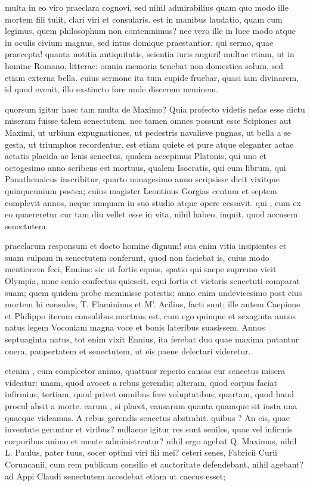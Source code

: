  multa in eo viro praeclara cognovi, sed nihil admirabilius quam quo modo ille mortem fili tulit, clari viri et consularis. est in manibus laudatio, quam cum legimus, quem philosophum non contemnimus? nec vero ille in luce modo atque in oculis civium magnus, sed intus domique praestantior. qui sermo, quae praecepta! quanta notitia antiquitatis, scientia iuris auguri! multae etiam, ut in homine Romano, litterae: omnia memoria tenebat non domestica solum, sed etiam externa bella. cuius sermone ita tum cupide fruebar, quasi iam divinarem, id quod evenit, illo exstincto fore unde discerem neminem.

 quorsum igitur haec tam multa de Maximo? Quia profecto videtis nefas esse dictu miseram fuisse talem senectutem. nec tamen omnes possunt esse Scipiones aut Maximi, ut urbium expugnationes, ut pedestris navalisve pugnas, ut bella a se gesta, ut triumphos recordentur. est etiam quiete et pure atque eleganter actae aetatis placida ac lenis senectus, qualem accepimus Platonis, qui uno et octogesimo anno scribens est mortuus, qualem Isocratis, qui eum librum, qui Panathenaicus inscribitur, quarto nonagesimo anno scripsisse dicit vixitque quinquennium postea; cuius magister Leontinus Gorgias centum et septem complevit annos, neque umquam in suo studio atque opere cessavit. qui , cum ex eo quaereretur cur tam diu vellet esse in vita, nihil habeo, inquit, quod accusem senectutem.

 praeclarum responsum et docto homine dignum! sua enim vitia insipientes et suam culpam in senectutem conferunt, quod non faciebat is, cuius modo mentionem feci, Ennius: sic ut fortis equus, spatio qui saepe supremo vicit Olympia, nunc senio confectus quiescit. equi fortis et victoris senectuti comparat suam; quem quidem probe meminisse potestis; anno enim undevicesimo post eius mortem hi consules, T. Flamininus et M'. Acilius, facti sunt; ille autem Caepione et Philippo iterum consulibus mortuus est, cum ego quinque et sexaginta annos natus legem Voconiam magna voce et bonis lateribus suasissem. Annos septuaginta natus, tot enim vixit Ennius, ita ferebat duo quae maxima putantur onera, paupertatem et senectutem, ut eis paene delectari videretur.

 etenim , cum complector animo, quattuor reperio causas cur senectus misera videatur: unam, quod avocet a rebus gerendis; alteram, quod corpus faciat infirmius; tertiam, quod privet omnibus fere voluptatibus; quartam, quod haud procul absit a morte. earum , si placet, causarum quanta quamque sit iusta una quaeque videamus. A rebus gerendis senectus abstrahit. quibus ? An eis, quae iuventute geruntur et viribus? nullaene igitur res sunt seniles, quae vel infirmis corporibus animo et mente administrentur? nihil ergo agebat Q. Maximus, nihil L. Paulus, pater tuus, socer optimi viri fili mei? ceteri senes, Fabricii Curii Coruncanii, cum rem publicam consilio et auctoritate defendebant, nihil agebant? ad Appi Claudi senectutem accedebat etiam ut caecus esset;


